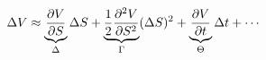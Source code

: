 \documentclass[preview]{standalone}
\begin{document}
\begin{align*}
\special{dvisvgm:raw <g id='unique000'>}\Delta V \approx \underbrace{\frac{\partial V}{\partial S}}_{\Delta} \Delta S + \underbrace{\frac{1}{2}\frac{\partial^2 V}{\partial S^2}}_{\Gamma} (\Delta S)^2 + \underbrace{\frac{\partial V}{\partial t}}_{\Theta} \Delta t + \cdots\special{dvisvgm:raw </g>}
\end{align*}
\end{document}
